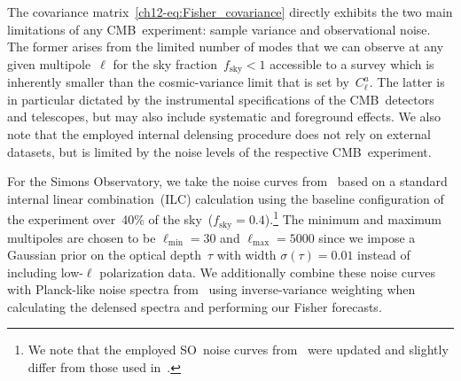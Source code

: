\begin{subappendices}
The covariance matrix~\eqref{ch12-eq:Fisher_covariance} directly exhibits the two main limitations of any CMB~experiment: sample variance and observational noise. The former arises from the limited number of modes that we can observe at any given multipole~$\ell$ for the sky fraction~$f_\mathrm{sky} < 1$ accessible to a survey which is inherently smaller than the cosmic-variance limit that is set by~$C_\ell^a$. The latter is in particular dictated by the instrumental specifications of the CMB~detectors and telescopes, but may also include systematic and foreground effects. We also note that the employed internal delensing procedure does not rely on external datasets, but is limited by the noise levels of the respective CMB~experiment.

For the Simons Observatory, we take the noise curves from~\cite{SimonsObservatory:2018koc, SimonsObservatory:2020noise} based on a standard internal linear combination~(ILC) calculation using the baseline configuration of the experiment over~40\% of the sky~($f_\mathrm{sky} = 0.4$).\footnote{We note that the employed SO~noise curves from~\cite{SimonsObservatory:2020noise} were updated and slightly differ from those used in~\cite{SimonsObservatory:2018koc}.} The minimum and maximum multipoles are chosen to be $\ell_\mathrm{min} = 30$ and $\ell_\mathrm{max} = 5000$ since we impose a Gaussian prior on the optical depth~$\tau$ with width $\sigma(\tau) = 0.01$ instead of including low-$\ell$ polarization data. We additionally combine these noise curves with Planck-like noise spectra from~\cite{Allison:2015qca} using inverse-variance weighting when calculating the delensed spectra and performing our Fisher forecasts.


\end{subappendices}
